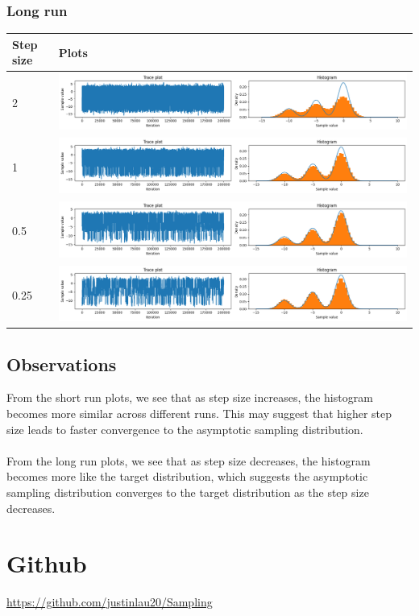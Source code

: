 \documentclass{article}
\theoremstyle{definition}
\newcommand{\1}{\mathbbm{1}}
\begin{document}
{\renewcommand{\arraystretch}{4}%
	\subsubsection{Long run}
	\begin{tabular}{|l|l|}
		\hline
		Step size & Plots\\
		\hline
		2 & \includegraphics[width=0.8\linewidth, height=0.1\linewidth, valign=m]{Different variance/2long.png} \\
		\hline
1 & \includegraphics[width=0.8\linewidth, height=0.1\linewidth, valign=m]{Different variance/1long.png} \\
		\hline
0.5 & \includegraphics[width=0.8\linewidth, height=0.1\linewidth, valign=m]{Different variance/0_5long.png} \\
		\hline
0.25 & \includegraphics[width=0.8\linewidth, height=0.1\linewidth, valign=m]{Different variance/0_25long.png} \\
\hline
	\end{tabular}
}
\subsection{Observations}
From the short run plots, we see that as step size increases, the histogram becomes more similar across different runs. This may suggest that higher step size leads to faster convergence to the asymptotic sampling distribution.
\\\\
From the long run plots, we see that as step size decreases, the histogram becomes more like the target distribution, which suggests the asymptotic sampling distribution converges to the target distribution as the step size decreases.

\section{Github}
\url{https://github.com/justinlau20/Sampling}
\end{document}
